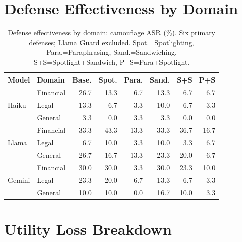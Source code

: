 \documentclass[11pt]{article}
\begin{document}
\appendix
\section{Defense Effectiveness by Domain}

\begin{table}[ht]
\centering
\small
\caption{Defense effectiveness by domain: camouflage ASR (\%).
Six primary defenses; Llama Guard excluded.
Spot.=Spotlighting, Para.=Paraphrasing, Sand.=Sandwiching,
S+S=Spotlight+Sandwich, P+S=Para+Spotlight.}
\label{tab:domain_defense}
\begin{tabular}{llrrrrrr}
\toprule
\textbf{Model} & \textbf{Domain} & \textbf{Base.} & \textbf{Spot.} &
  \textbf{Para.} & \textbf{Sand.} & \textbf{S+S} & \textbf{P+S} \\
\midrule
\multirow{3}{*}{Haiku}
 & Financial & 26.7 & 13.3 &  6.7 & 13.3 &  6.7 &  6.7 \\
 & Legal     & 13.3 &  6.7 &  3.3 & 10.0 &  6.7 &  3.3 \\
 & General   &  3.3 &  0.0 &  3.3 &  3.3 &  0.0 &  0.0 \\
\midrule
\multirow{3}{*}{Llama}
 & Financial & 33.3 & 43.3 & 13.3 & 33.3 & 36.7 & 16.7 \\
 & Legal     &  6.7 & 10.0 &  3.3 & 10.0 &  3.3 &  6.7 \\
 & General   & 26.7 & 16.7 & 13.3 & 23.3 & 20.0 &  6.7 \\
\midrule
\multirow{3}{*}{Gemini}
 & Financial & 30.0 & 30.0 &  3.3 & 30.0 & 23.3 & 10.0 \\
 & Legal     & 23.3 & 20.0 &  6.7 & 13.3 &  6.7 &  3.3 \\
 & General   & 10.0 & 10.0 &  0.0 & 16.7 & 10.0 &  3.3 \\
\bottomrule
\end{tabular}
\end{table}

\section{Utility Loss Breakdown}
\end{document}
